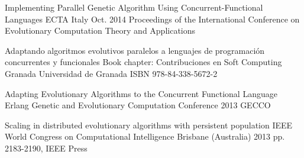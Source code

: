 


\begin{cventries}


\cventry
{Implementing Parallel Genetic Algorithm Using Concurrent-Functional Languages} %
{ECTA} %
{Italy} %
{Oct. 2014} %
{ %
Proceedings of the International Conference on Evolutionary Computation Theory and Applications
}


\cventry
{Adaptando algoritmos evolutivos paralelos a lenguajes de programación concurrentes y funcionales} %
{Book chapter: Contribuciones en Soft Computing} %
{Granada} %
{Universidad de Granada} %
{ %
ISBN 978-84-338-5672-2
}


\cventry
{Adapting Evolutionary Algorithms to the Concurrent Functional Language Erlang} %
{Genetic and Evolutionary Computation Conference} %
{} %
{2013} %
{ %
GECCO
}


\cventry
{Scaling in distributed evolutionary algorithms with persistent population} %
{IEEE World Congress on Computational Intelligence} %
{Brisbane (Australia)} %
{2013} %
{ %
pp. 2183-2190, IEEE Press
}


\end{cventries}
